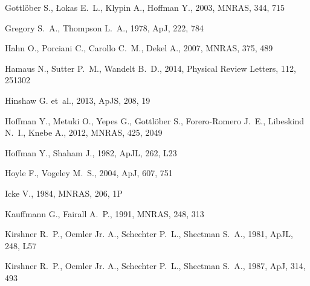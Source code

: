 \documentclass[a4,useAMS,usenatbib,usegraphicx]{mn2e}
\newcommand{\apj}{ApJ}
\newcommand{\apjs}{ApJS}
\newcommand{\apjl}{ApJL}
\newcommand{\mnras}{MNRAS}
\begin{document}
\begin{thebibliography}{}
{Gottl{\"o}ber} S.,  {{\L}okas} E.~L.,  {Klypin} A.,    {Hoffman} Y.,  2003,
  \mnras, 344, 715

{Gregory} S.~A.,  {Thompson} L.~A.,  1978, \apj, 222, 784

{Hahn} O.,  {Porciani} C.,  {Carollo} C.~M.,    {Dekel} A.,  2007, \mnras, 375,
  489

{Hamaus} N.,  {Sutter} P.~M.,    {Wandelt} B.~D.,  2014, Physical Review
  Letters, 112, 251302

{Hinshaw} G.  et~al., 2013, \apjs, 208, 19

{Hoffman} Y.,  {Metuki} O.,  {Yepes} G.,  {Gottl{\"o}ber} S.,  {Forero-Romero}
  J.~E.,  {Libeskind} N.~I.,    {Knebe} A.,  2012, \mnras, 425, 2049

{Hoffman} Y.,  {Shaham} J.,  1982, \apjl, 262, L23

{Hoyle} F.,  {Vogeley} M.~S.,  2004, \apj, 607, 751

{Icke} V.,  1984, \mnras, 206, 1P

{Kauffmann} G.,  {Fairall} A.~P.,  1991, \mnras, 248, 313

{Kirshner} R.~P.,  {Oemler} Jr. A.,  {Schechter} P.~L.,    {Shectman} S.~A.,
  1981, \apjl, 248, L57

{Kirshner} R.~P.,  {Oemler} Jr. A.,  {Schechter} P.~L.,    {Shectman} S.~A.,
  1987, \apj, 314, 493


\end{thebibliography}
\end{document}
